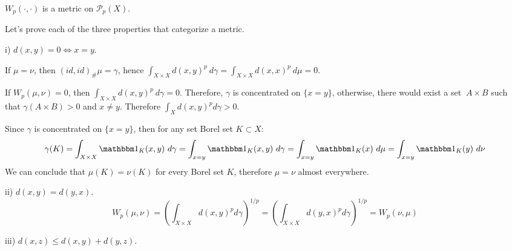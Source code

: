 \begin{proposition}
  $W_p(\cdot,\cdot)$ is a metric on $\mathcal P_p(X)$.
\end{proposition}
\begin{prf} Let's prove each of the three properties that categorize a metric.

  \vspace{5mm}
  \noindent	i) $d(x,y) = 0 \iff x = y$.

  \vspace{5mm}
  \noindent
  If $\mu=\nu$, then
  $(id,id)_\# \mu = \gamma$, hence $\int_{X \times X} d(x,y)^p
    \ d\gamma = \int_{X \times X} d(x,x)^p \ d\mu =0$.

  \vspace{5mm}
  If $W_p(\mu,\nu)=0$, then $\int_{X\times X}d(x,y)^p \ d\gamma = 0$. Therefore, $\gamma$ is concentrated
  on $\{x=y\}$, otherwise, there would exist a set $\ A \times B$ such that $\gamma(A \times B)>0$ and $x\neq y$.
  Therefore $\int_X d(x,y)^p d\gamma >0$.

  Since $\gamma$ is concentrated on $\{x=y\}$, then for any set Borel set $K \subset X$:
  \begin{equation*}
    \gamma(K) = \int_{X\times X} \mathbbm 1_K(x,y) \ d\gamma =
    \int_{x=y} \mathbbm 1_K(x,y) \ d\gamma = \int_{x=y} \mathbbm 1_K(x) \ d\mu
    = \int_{x=y} \mathbbm 1_K (y) \ d\nu
  \end{equation*}
  We can conclude that $\mu(K)=\nu(K)$ for every Borel set $K$, therefore $\mu=\nu$ almost everywhere.

  \vspace{5mm}

  \noindent	ii) $d(x,y)=d(y,x)$.
  \begin{equation*}
    W_p(\mu,\nu) = \left(\int_{X \times X} d(x,y)^p d\gamma \right)^{1/p} =
    \left(\int_{X \times X} d(y,x)^p d\gamma\right)^{1/p} = W_p(\nu,\mu)
  \end{equation*}

  \vspace{5mm}
  \noindent	iii) $d(x,z) \leq d(x,y) + d(y,z)$.


\end{prf}
